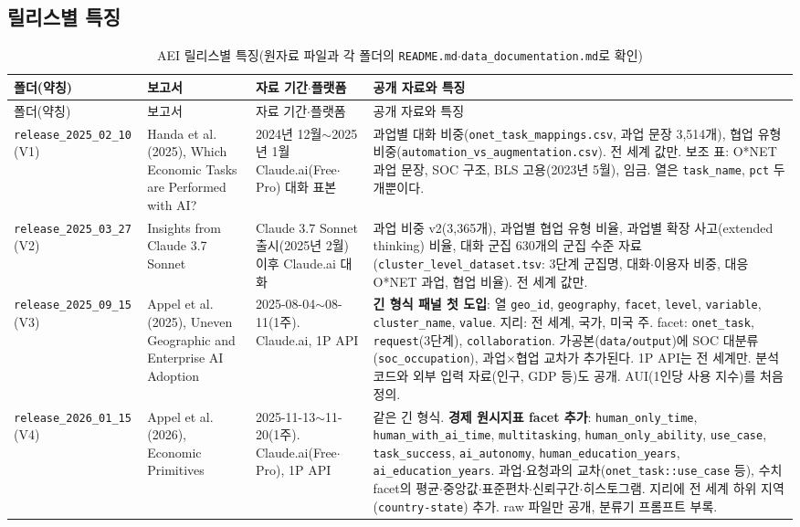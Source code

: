 \documentclass[11pt]{article}
\begin{document}
\subsection{릴리스별 특징}

{\small
\begin{longtable}{L{2.0cm}L{3.0cm}L{3.2cm}L{8.6cm}}
\caption{AEI 릴리스별 특징(원자료 파일과 각 폴더의 \texttt{README.md}$\cdot$\texttt{data\_documentation.md}로 확인)}\label{tab:releases}\\
\toprule
폴더(약칭) & 보고서 & 자료 기간$\cdot$플랫폼 & 공개 자료와 특징 \\
\midrule
\endfirsthead
\toprule
폴더(약칭) & 보고서 & 자료 기간$\cdot$플랫폼 & 공개 자료와 특징 \\
\midrule
\endhead
\texttt{release\_2025\_02\_10} (V1) & Handa et al.(2025), Which Economic Tasks are Performed with AI? & 2024년 12월$\sim$2025년 1월 Claude.ai(Free$\cdot$Pro) 대화 표본 & 과업별 대화 비중(\texttt{onet\_task\_mappings.csv}, 과업 문장 3,514개), 협업 유형 비중(\texttt{automation\_vs\_augmentation.csv}). 전 세계 값만. 보조 표: O*NET 과업 문장, SOC 구조, BLS 고용(2023년 5월), 임금. 열은 \texttt{task\_name}, \texttt{pct} 두 개뿐이다. \\
\texttt{release\_2025\_03\_27} (V2) & Insights from Claude 3.7 Sonnet & Claude 3.7 Sonnet 출시(2025년 2월) 이후 Claude.ai 대화 & 과업 비중 v2(3,365개), 과업별 협업 유형 비율, 과업별 확장 사고(extended thinking) 비율, 대화 군집 630개의 군집 수준 자료(\texttt{cluster\_level\_dataset.tsv}: 3단계 군집명, 대화$\cdot$이용자 비중, 대응 O*NET 과업, 협업 비율). 전 세계 값만. \\
\texttt{release\_2025\_09\_15} (V3) & Appel et al.(2025), Uneven Geographic and Enterprise AI Adoption & 2025-08-04$\sim$08-11(1주). Claude.ai, 1P API & \textbf{긴 형식 패널 첫 도입}: 열 \texttt{geo\_id}, \texttt{geography}, \texttt{facet}, \texttt{level}, \texttt{variable}, \texttt{cluster\_name}, \texttt{value}. 지리: 전 세계, 국가, 미국 주. facet: \texttt{onet\_task}, \texttt{request}(3단계), \texttt{collaboration}. 가공본(\texttt{data/output})에 SOC 대분류(\texttt{soc\_occupation}), 과업$\times$협업 교차가 추가된다. 1P API는 전 세계만. 분석 코드와 외부 입력 자료(인구, GDP 등)도 공개. AUI(1인당 사용 지수)를 처음 정의. \\
\texttt{release\_2026\_01\_15} (V4) & Appel et al.(2026), Economic Primitives & 2025-11-13$\sim$11-20(1주). Claude.ai(Free$\cdot$Pro), 1P API & 같은 긴 형식. \textbf{경제 원시지표 facet 추가}: \texttt{human\_only\_time}, \texttt{human\_with\_ai\_time}, \texttt{multitasking}, \texttt{human\_only\_ability}, \texttt{use\_case}, \texttt{task\_success}, \texttt{ai\_autonomy}, \texttt{human\_education\_years}, \texttt{ai\_education\_years}. 과업$\cdot$요청과의 교차(\texttt{onet\_task::use\_case} 등), 수치 facet의 평균$\cdot$중앙값$\cdot$표준편차$\cdot$신뢰구간$\cdot$히스토그램. 지리에 전 세계 하위 지역(\texttt{country-state}) 추가. raw 파일만 공개, 분류기 프롬프트 부록. \\

\end{longtable}}
\end{document}
